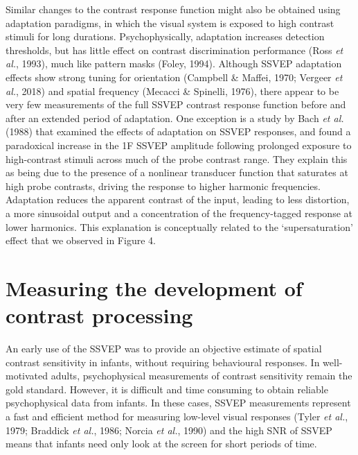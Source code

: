 \documentclass[
  letterpaper,
  DIV=11,
  numbers=noendperiod]{scrartcl}
\begin{document}
Similar changes to the contrast response function might also be obtained
using adaptation paradigms, in which the visual system is exposed to
high contrast stimuli for long durations. Psychophysically, adaptation
increases detection thresholds, but has little effect on contrast
discrimination performance (Ross \emph{et al.}, 1993), much like pattern
masks (Foley, 1994). Although SSVEP adaptation effects show strong
tuning for orientation (Campbell \& Maffei, 1970; Vergeer \emph{et al.},
2018) and spatial frequency (Mecacci \& Spinelli, 1976), there appear to
be very few measurements of the full SSVEP contrast response function
before and after an extended period of adaptation. One exception is a
study by Bach \emph{et al.} (1988) that examined the effects of
adaptation on SSVEP responses, and found a paradoxical increase in the
1F SSVEP amplitude following prolonged exposure to high-contrast stimuli
across much of the probe contrast range. They explain this as being due
to the presence of a nonlinear transducer function that saturates at
high probe contrasts, driving the response to higher harmonic
frequencies. Adaptation reduces the apparent contrast of the input,
leading to less distortion, a more sinusoidal output and a concentration
of the frequency-tagged response at lower harmonics. This explanation is
conceptually related to the `supersaturation' effect that we observed in
Figure 4.

\section{Measuring the development of contrast
processing}\label{measuring-the-development-of-contrast-processing}

An early use of the SSVEP was to provide an objective estimate of
spatial contrast sensitivity in infants, without requiring behavioural
responses. In well-motivated adults, psychophysical measurements of
contrast sensitivity remain the gold standard. However, it is difficult
and time consuming to obtain reliable psychophysical data from infants.
In these cases, SSVEP measurements represent a fast and efficient method
for measuring low-level visual responses (Tyler \emph{et al.}, 1979;
Braddick \emph{et al.}, 1986; Norcia \emph{et al.}, 1990) and the high
SNR of SSVEP means that infants need only look at the screen for short
periods of time.
\end{document}
